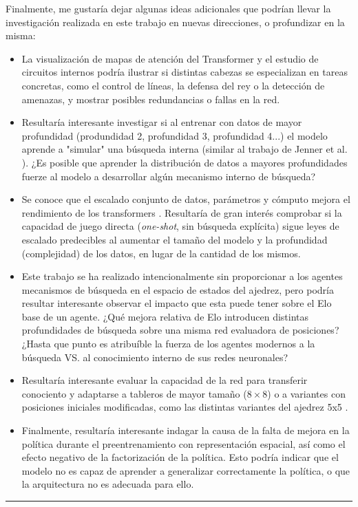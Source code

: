 \documentclass[12pt, a4paper]{article}
\let\cite\supercite
\begin{document}
Finalmente, me gustaría dejar algunas ideas adicionales que podrían llevar la investigación realizada en este trabajo en nuevas direcciones, o profundizar en la misma:

\begin{itemize}
    \item La visualización de mapas de atención del Transformer y el estudio de circuitos internos \cite{kormu2024lc0attentionvisualizer} podría ilustrar si distintas cabezas se especializan en tareas concretas, como el control de líneas, la defensa del rey o la detección de amenazas, y mostrar posibles redundancias o fallas en la red.
    \item Resultaría interesante investigar si al entrenar con datos de mayor profundidad (produndidad 2, profundidad 3, profundidad 4...) el modelo aprende a "simular" una búsqueda interna (similar al trabajo de Jenner et al. \cite{jenner2024evidencelearnedlookaheadchessplaying}). ¿Es posible que aprender la distribución de datos a mayores profundidades fuerze al modelo a desarrollar algún mecanismo interno de búsqueda?
    \item Se conoce que el escalado conjunto de datos, parámetros y cómputo mejora el rendimiento de los transformers \cite{hoffmann2022trainingcomputeoptimallargelanguage}. Resultaría de gran interés comprobar si la capacidad de juego directa (\textit{one-shot}, sin búsqueda explícita) sigue leyes de escalado predecibles al aumentar el tamaño del modelo y la profundidad (complejidad) de los datos, en lugar de la cantidad de los mismos.
    \item Este trabajo se ha realizado intencionalmente sin proporcionar a los agentes mecanismos de búsqueda en el espacio de estados del ajedrez, pero podría resultar interesante observar el impacto que esta puede tener sobre el Elo base de un agente. ¿Qué mejora relativa de Elo introducen distintas profundidades de búsqueda sobre una misma red evaluadora de posiciones? ¿Hasta que punto es atribuíble la fuerza de los agentes modernos a la búsqueda VS. al conocimiento interno de sus redes neuronales?
    \item Resultaría interesante evaluar la capacidad de la red para transferir conociento y adaptarse a tableros de mayor tamaño ($8 \times 8$) o a variantes con posiciones iniciales modificadas, como las distintas variantes del ajedrez 5x5 \cite{minichess_variants}.
    \item Finalmente, resultaría interesante indagar la causa de la falta de mejora en la política durante el preentrenamiento con representación espacial, así como el efecto negativo de la factorización de la política. Esto podría indicar que el modelo no es capaz de aprender a generalizar correctamente la política, o que la arquitectura no es adecuada para ello. 
\end{itemize}
\rule{\textwidth}{0.2pt}
\end{document}

